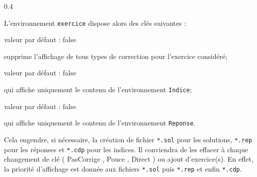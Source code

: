\documentclass[12pt,french]{article}
\newcommand\Cle[1]{%
  {\sffamily\textlangle #1\textrangle}%
}%
\newcommand{\Defaut}[1]{%
\hfill valeur par défaut : {\sffamily #1}\par%
}%
\newenvironment{Description}
               {\list{}{\labelwidth0pt \leftmargin0pt \itemindent-\leftmargin
                        \let\makelabel\Descriptionlabel}}
               {\endlist}
\newcommand*\Descriptionlabel[1]{\hspace\labelsep
                                \normalfont\bfseries #1}
\begin{document}
\begin{Codes}{0.4}{}
\begin{exercice}
    
\end{exercice}
\begin{Solution}
  
\end{Solution}
\begin{Reponse}
  
\end{Reponse}
\begin{Indice}
  
\end{Indice}
\end{Codes}
L'environnement \lstinline!exercice! dispose alors des clés suivantes :
\begin{Description}
\item[la Clé \Cle{PasCorrige}]\Defaut{false}\par supprime l'affichage de tous types de correction pour l'exercice considéré;
\item[la Clé \Cle{Pouce}]\Defaut{false}\par qui affiche uniquement le contenu de l'environnement \lstinline!Indice!;
\item[la Clé \Cle{Direct}]\Defaut{false}\par qui affiche uniquement le contenu de l'environnement \lstinline!Reponse!.
\end{Description}

\bigskip

Cela engendre, si nécessaire, la création de fichier \lstinline!*.sol! pour les solutions, \lstinline!*.rep! pour les réponses et \lstinline!*.cdp! pour les indices. Il conviendra de les effacer à chaque changement de clé (\Cle{PasCorrige}, \Cle{Pouce}, \Cle{Direct}) ou ajout d'exercice(s). En effet, la priorité d'affichage est donnée aux fichiers \lstinline!*.sol! puis \lstinline!*.rep! et enfin \lstinline!*.cdp!.

\bigskip
\end{document}

